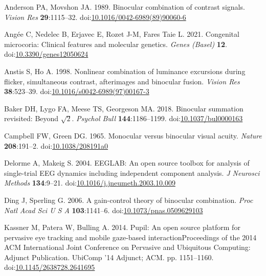 \documentclass[
]{article}
\newlength{\cslhangindent}
\newlength{\cslentryspacingunit} %
\newenvironment{CSLReferences}[2] %
 {%
  \setlength{\parindent}{0pt}
  \ifodd #1
  \let\oldpar\par
  \def\par{\hangindent=\cslhangindent\oldpar}
  \fi
  \setlength{\parskip}{#2\cslentryspacingunit}
 }%
 {}
\begin{document}
\hypertarget{refs}{}
\begin{CSLReferences}{1}{0}
\leavevmode{}%
Anderson PA, Movshon JA. 1989. Binocular combination of contrast signals. \emph{Vision Res} \textbf{29}:1115--32. doi:\href{https://doi.org/10.1016/0042-6989(89)90060-6}{10.1016/0042-6989(89)90060-6}

\leavevmode{}%
Angée C, Nedelec B, Erjavec E, Rozet J-M, Fares Taie L. 2021. Congenital microcoria: Clinical features and molecular genetics. \emph{Genes (Basel)} \textbf{12}. doi:\href{https://doi.org/10.3390/genes12050624}{10.3390/genes12050624}

\leavevmode{}%
Anstis S, Ho A. 1998. Nonlinear combination of luminance excursions during flicker, simultaneous contrast, afterimages and binocular fusion. \emph{Vision Res} \textbf{38}:523--39. doi:\href{https://doi.org/10.1016/s0042-6989(97)00167-3}{10.1016/s0042-6989(97)00167-3}

\leavevmode{}%
Baker DH, Lygo FA, Meese TS, Georgeson MA. 2018. Binocular summation revisited: Beyond \(\sqrt{2}\). \emph{Psychol Bull} \textbf{144}:1186--1199. doi:\href{https://doi.org/10.1037/bul0000163}{10.1037/bul0000163}

\leavevmode{}%
Campbell FW, Green DG. 1965. Monocular versus binocular visual acuity. \emph{Nature} \textbf{208}:191--2. doi:\href{https://doi.org/10.1038/208191a0}{10.1038/208191a0}

\leavevmode{}%
Delorme A, Makeig S. 2004. EEGLAB: An open source toolbox for analysis of single-trial EEG dynamics including independent component analysis. \emph{J Neurosci Methods} \textbf{134}:9--21. doi:\href{https://doi.org/10.1016/j.jneumeth.2003.10.009}{10.1016/j.jneumeth.2003.10.009}

\leavevmode{}%
Ding J, Sperling G. 2006. A gain-control theory of binocular combination. \emph{Proc Natl Acad Sci U S A} \textbf{103}:1141--6. doi:\href{https://doi.org/10.1073/pnas.0509629103}{10.1073/pnas.0509629103}

\leavevmode{}%
Kassner M, Patera W, Bulling A. 2014. Pupil: An open source platform for pervasive eye tracking and mobile gaze-based interactionProceedings of the 2014 {ACM} International Joint Conference on Pervasive and Ubiquitous Computing: Adjunct Publication. UbiComp '14 Adjunct; {ACM}. pp. 1151--1160. doi:\href{https://doi.org/10.1145/2638728.2641695}{10.1145/2638728.2641695}


\end{CSLReferences}
\end{document}
